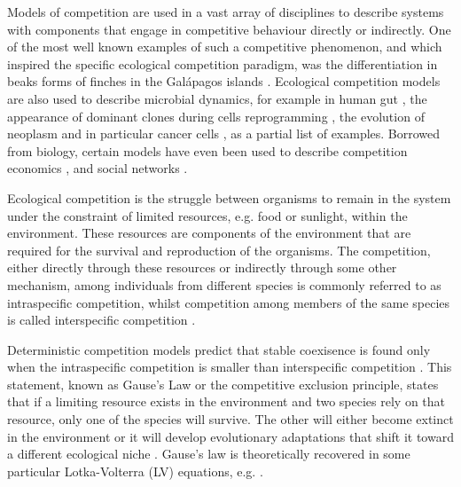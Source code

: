 \documentclass[9pt,lineno]{elife}
\begin{document}
Models of competition are used in a vast array of disciplines to describe systems with components that engage in competitive behaviour directly or indirectly. 
One of the most well known examples of such a competitive phenomenon, and which inspired the specific ecological competition paradigm, was the differentiation in beaks forms of finches in the Gal\'apagos islands \cite{lewin1983finches,lack1983darwin}. 
Ecological competition models are also used to describe microbial dynamics, for example in human gut \cite{coyte2015ecology,gorter2020understanding}, the appearance of dominant clones during cells reprogramming \cite{shakiba2019cell}, the evolution of neoplasm and in particular cancer cells \cite{merlo2006cancer,kareva2015cancer}, as a partial list of examples.
Borrowed from biology, certain models have even been used to describe competition  economics \cite{budzinski2007monoculture}, and social networks \cite{koura2017competitive}.

Ecological competition is the struggle between organisms to remain in the system under the constraint of limited resources, e.g. food or sunlight, within the environment. 
These resources are components of the environment that are required for the survival and reproduction of the organisms.
The competition, either directly through these resources or indirectly through some other mechanism, among individuals from different species is commonly referred to as intraspecific competition, whilst competition among members of the same species is called interspecific competition \cite{grover1997resource,begon2006ecology,pocheville2015ecological}. 

Deterministic competition models predict that stable coexisence is found only when the intraspecific competition is smaller than interspecific competition  \cite{hardin1960competitive,macarthur1967limiting,MacArthur1969species, gause2019struggle}.
This statement, known as Gause's Law or the competitive exclusion principle, states that if a limiting resource exists in the environment and two species rely on that resource, only one of the species will survive. %
The other will either become extinct in the environment or it will develop evolutionary adaptations that shift it toward a different ecological niche \cite{hardin1960competitive}. 
Gause’s law is theoretically recovered in some particular Lotka-Volterra (LV) equations, e.g. \cite{macarthur1967limiting,MacArthur1969species}.
\end{document}
